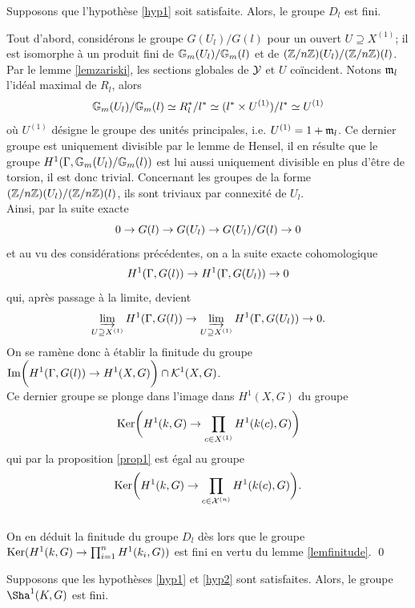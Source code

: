 \documentclass[11pt]{article}
\begin{document}
\begin{prop}\label{propDk1}
Supposons que l'hypothèse \ref{hyp1} soit satisfaite. Alors, le groupe $D_{l}$ est fini. 
\end{prop} 

\proof Tout d'abord, considérons le groupe $G(U_l)/ G(l)$ pour un ouvert $U \supseteq X^{(1)}$; il est isomorphe à un produit fini de $\mathbb{G}_m(U_l)/ \mathbb{G}_m(l)$ et de $(\mathbb{Z}/n\mathbb{Z})(U_l)/ (\mathbb{Z}/n\mathbb{Z})(l)$. \\
Par le lemme \ref{lemzariski}, les sections globales de $\mathcal{Y}$ et $U$ coïncident. Notons $\mathfrak{m}_l$ l'idéal maximal de $R_l$, alors
$$
\mathbb{G}_m(U_l)/ \mathbb{G}_m(l) \simeq R_l^*/l^* \simeq (l^* \times U^{(1)}) / l^* \simeq  U^{(1)}
$$où $ U^{(1)}$ désigne le groupe des unités principales, i.e.  $U^{(1)} = 1+\mathfrak{m}_l$. Ce dernier groupe est uniquement divisible par le lemme de Hensel, il en résulte que le groupe $H^1(\Gamma, \mathbb{G}_m(U_l)/ \mathbb{G}_m(l))$ est lui aussi uniquement divisible en plus d'être de torsion, il est donc trivial. Concernant les groupes de la forme $(\mathbb{Z}/n\mathbb{Z})(U_l)/ (\mathbb{Z}/n\mathbb{Z})(l)$, ils sont triviaux par connexité de $U_l$.\\

Ainsi, par la suite exacte
$$
0 \rightarrow G(l) \rightarrow G(U_l) \rightarrow G(U_l)/ G(l) \rightarrow 0
$$
 et au vu des considérations précédentes, on a la suite exacte cohomologique
$$
H^1(\Gamma, G(l)) \rightarrow H^1(\Gamma,G(U_l)) \rightarrow 0
$$
qui, après passage à la limite, devient 
$$
\varinjlim_{U \supseteq X^{(1)}} H^1(\Gamma, G(l)) \rightarrow \varinjlim_{U \supseteq X^{(1)}} H^1(\Gamma,G(U_l)) \rightarrow 0.
$$
On se ramène donc à établir la finitude du groupe  $\displaystyle \text{Im}\bigg(H^1(\Gamma, G(l)) \rightarrow H^1(X, G)\bigg) \cap \mathcal{K}^1(X, G) $.\\

Ce dernier groupe se plonge dans l'image dans $H^1(X, G)$ du groupe 
$$
\text{Ker}\bigg(H^1(k, G) \rightarrow \prod_{c \in X^{(1)}} H^1(k(c), G)\bigg)
$$
qui par la proposition \ref{prop1} est égal au groupe
$$
\text{Ker}\bigg(H^1(k, G) \rightarrow \prod_{c \in \mathcal{X}^{(n)}} H^1(k(c), G)\bigg).
$$
\\
On en déduit la finitude du groupe $D_{l}$ dès lors que le groupe 
$\text{Ker}(H^1(k,G) \rightarrow \prod_{i=1}^{n}H^1(k_i,G))$ est fini en vertu du lemme \ref{lemfinitude}. \qed\\


\begin{thme}\label{thme}
    Supposons que les hypothèses \ref{hyp1} et \ref{hyp2} sont satisfaites. Alors, le groupe $\Sha^1(K,G)$ est fini.
\end{thme}
\end{document}
